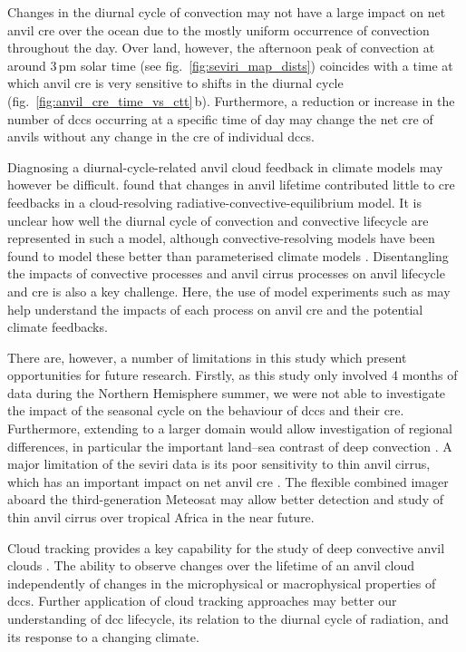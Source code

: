 Changes in the diurnal cycle of convection may not have a large impact on net anvil \acrshort{cre} over the ocean due to the mostly uniform occurrence of convection throughout the day.
Over land, however, the afternoon peak of convection at around 3\,pm solar time (see fig.~\ref{fig:seviri_map_dists}) coincides with a time at which anvil \acrshort{cre} is very sensitive to shifts in the diurnal cycle (fig.~\ref{fig:anvil_cre_time_vs_ctt}\,b).
Furthermore, a reduction or increase in the number of \acrshort{dcc}s occurring at a specific time of day may change the net \acrshort{cre} of anvils without any change in the \acrshort{cre} of individual \acrshort{dcc}s.

Diagnosing a diurnal-cycle-related anvil cloud feedback in climate models may however be difficult.
\citet{beydoun_dissecting_2021} found that changes in anvil lifetime contributed little to \acrshort{cre} feedbacks in a cloud-resolving radiative-convective-equilibrium model.
It is unclear how well the diurnal cycle of convection and convective lifecycle are represented in such a model, although convective-resolving models have been found to model these better than parameterised climate models \citep{prein_review_2015, feng_mesoscale_2023}.
Disentangling the impacts of convective processes and anvil cirrus processes on anvil lifecycle and \acrshort{cre} is also a key challenge.
Here, the use of model experiments such as \citet{gasparini_diurnal_2022} may help understand the impacts of each process on anvil \acrfull{cre} and the potential climate feedbacks.

There are, however, a number of limitations in this study which present opportunities for future research. 
Firstly, as this study only involved 4 months of data during the Northern Hemisphere summer, we were not able to investigate the impact of the seasonal cycle on the behaviour of \acrshort{dcc}s and their \acrshort{cre}. 
Furthermore, extending to a larger domain would allow investigation of regional differences, in particular the important land--sea contrast of deep convection \citep{takahashi_revisiting_2023}. 
A major limitation of the \acrshort{seviri} data is its poor sensitivity to thin anvil cirrus, which has an important impact on net anvil \acrshort{cre} \citep{protopapadaki_upper_2017, horner_evolution_2023}.
The flexible combined imager \citep{martin_fci_2021} aboard the third-generation Meteosat may allow better detection and study of thin anvil cirrus over tropical Africa in the near future.

Cloud tracking provides a key capability for the study of deep convective anvil clouds \citep{gasparini_opinion_2023}.
The ability to observe changes over the lifetime of an anvil cloud independently of changes in the microphysical or macrophysical properties of \acrshort{dcc}s.
Further application of cloud tracking approaches may better our understanding of \acrshort{dcc} lifecycle, its relation to the diurnal cycle of radiation, and its response to a changing climate.

